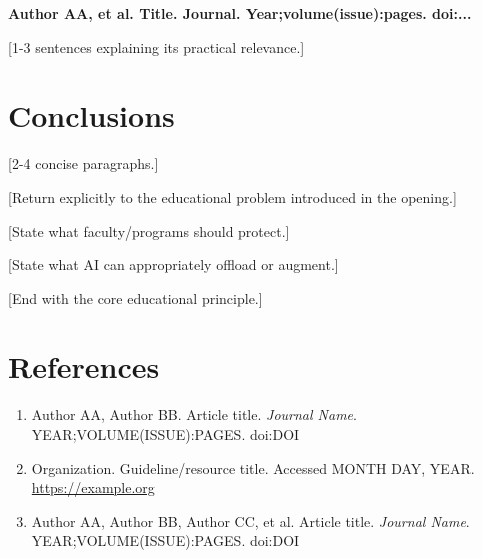 \documentclass[12pt]{article}
\begin{document}
\vspace{0.8em}

\textbf{Author AA, et al. Title. Journal. Year;volume(issue):pages.
	doi:...}

[1-3 sentences explaining its practical relevance.]


\section*{Conclusions}


 [2-4 concise paragraphs.]

 [Return explicitly to the educational problem introduced in the opening.]

 [State what faculty/programs should protect.]

 [State what AI can appropriately offload or augment.]

 [End with the core educational principle.]


\section*{References}


\begin{enumerate}
	\item Author AA, Author BB. Article title. \textit{Journal Name}.
	      YEAR;VOLUME(ISSUE):PAGES. doi:DOI

	\item Organization. Guideline/resource title. Accessed MONTH DAY, YEAR.
	      \url{https://example.org}

	\item Author AA, Author BB, Author CC, et al. Article title.
	      \textit{Journal Name}. YEAR;VOLUME(ISSUE):PAGES. doi:DOI
\end{enumerate}
\end{document}
